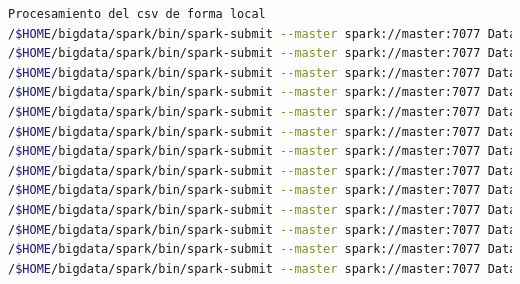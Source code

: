 \begin{lstlisting}[label=sprocDis,language=sh,frame=single,caption=Script procesamiento de datos en modo distribuido]
 Procesamiento del csv de forma local
/$HOME/bigdata/spark/bin/spark-submit --master spark://master:7077 DataProcessing.py mil.csv mil mil
/$HOME/bigdata/spark/bin/spark-submit --master spark://master:7077 DataProcessing.py quinientos.csv quinientos quinientos
/$HOME/bigdata/spark/bin/spark-submit --master spark://master:7077 DataProcessing.py cinquenta.csv cinquenta cinquenta
/$HOME/bigdata/spark/bin/spark-submit --master spark://master:7077 DataProcessing.py 1decimo.csv 1decimo 1decimo
/$HOME/bigdata/spark/bin/spark-submit --master spark://master:7077 DataProcessing.py 2decimo.csv 2decimo 2decimo
/$HOME/bigdata/spark/bin/spark-submit --master spark://master:7077 DataProcessing.py 3decimo.csv 3decimo 3decimo
/$HOME/bigdata/spark/bin/spark-submit --master spark://master:7077 DataProcessing.py 4decimo.csv 4decimo 4decimo
/$HOME/bigdata/spark/bin/spark-submit --master spark://master:7077 DataProcessing.py half.csv half half
/$HOME/bigdata/spark/bin/spark-submit --master spark://master:7077 DataProcessing.py 6decimo.csv 6decimo1 6decimo
/$HOME/bigdata/spark/bin/spark-submit --master spark://master:7077 DataProcessing.py 7decimo.csv 7decimo1 7decimo
/$HOME/bigdata/spark/bin/spark-submit --master spark://master:7077 DataProcessing.py 8decimo.csv 8decimo1 8decimo
/$HOME/bigdata/spark/bin/spark-submit --master spark://master:7077 DataProcessing.py 9decimo.csv 9decimo1 9decimo
/$HOME/bigdata/spark/bin/spark-submit --master spark://master:7077 DataProcessing.py full.csv full1 full
\end{lstlisting}

